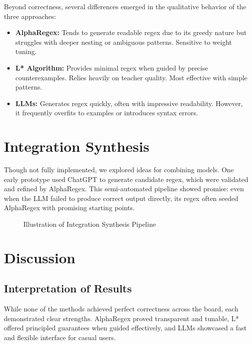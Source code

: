 \indent\indent Beyond correctness, several differences emerged in the qualitative behavior of the three approaches:

\begin{itemize}
\item \textbf{AlphaRegex:} Tends to generate readable regex due to its greedy nature but struggles with deeper nesting or ambiguous patterns. Sensitive to weight tuning.
\item \textbf{L* Algorithm:} Provides minimal regex when guided by precise counterexamples. Relies heavily on teacher quality. Most effective with simple patterns.
\item \textbf{LLMs:} Generates regex quickly, often with impressive readability. However, it frequently overfits to examples or introduces syntax errors.
\end{itemize}

\section{Integration Synthesis}

\indent\indent Though not fully implemented, we explored ideas for combining models. One early prototype used ChatGPT to generate candidate regex, which were validated and refined by AlphaRegex. This semi-automated pipeline showed promise: even when the LLM failed to produce correct output directly, its regex often seeded AlphaRegex with promising starting points.

\begin{figure}[h!]
\centering
{}
\caption{Illustration of Integration Synthesis Pipeline}
\end{figure}

\section{Discussion}

\subsection{Interpretation of Results}

\indent\indent While none of the methods achieved perfect correctness across the board, each demonstrated clear strengths. AlphaRegex proved transparent and tunable, L* offered principled guarantees when guided effectively, and LLMs showcased a fast and flexible interface for casual users.

